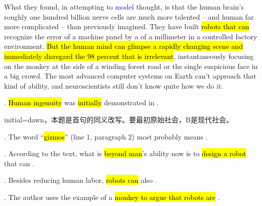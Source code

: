What they found, in attempting to \textcolor{blue}{model} thought, is that the human brain’s roughly one hundred billion nerve cells are much more talented -- and human 
far more complicated -- than previously imagined. They have built    \hl{robots that can} recognize the error of a machine panel by a 
 of a millimeter in a controlled factory environment. 
   \hl{But the human mind can glimpse a rapidly changing scene and immediately disregard the 98 percent that is irrelevant}, instantaneously focusing on the monkey at the side of a winding forest road or the single suspicious face in a big crowd. The most advanced computer systems on Earth can’t approach that kind of ability, and neuroscientists still don’t know quite how we do it.

\begin{questions} 
.	\hl{Human ingenuity} was \hl{initially} demonstrated in \ltk{}.\\
\begin{solution}
initial=dawn，本题是首句的同义改写。要最初原始社会，B是现代社会。
\end{solution}

.	The word “\hl{gizmos}” (line 1, paragraph 2) most probably means \ltk{}.\\

.	According to the text, what is \hl{beyond man}’s ability now is to \hl{design a robot} that can \ltk{}.\\

.	Besides reducing human labor, \hl{robots can} also \ltk{}.\\

.	The author uses the example of a \hl{monkey to argue that robots are} \ltk{}.\\
\end{questions}

